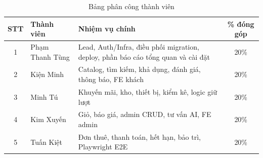 \begin{table}[H]
\centering
\caption{Bảng phân công thành viên}
\label{tab:phan_cong_thanh_vien}
\begin{tabularx}{\textwidth}{|c|l|X|c|}
\hline
\textbf{STT} & \textbf{Thành viên} & \textbf{Nhiệm vụ chính} & \textbf{\% đóng góp} \\ \hline
1 & Phạm Thanh Tùng & Lead, Auth/Infra, điều phối migration, deploy, phần báo cáo tổng quan và cài đặt & 20\% \\ \hline
2 & Kiện Minh & Catalog, tìm kiếm, khả dụng, đánh giá, thông báo, FE khách & 20\% \\ \hline
3 & Minh Tú & Khuyến mãi, kho, thiết bị, kiểm kê, logic giữ lượt & 20\% \\ \hline
4 & Kim Xuyến & Giỏ, báo giá, admin CRUD, tư vấn AI, FE admin & 20\% \\ \hline
5 & Tuấn Kiệt & Đơn thuê, thanh toán, hết hạn, bảo trì, Playwright E2E & 20\% \\ \hline
\end{tabularx}
\end{table}

